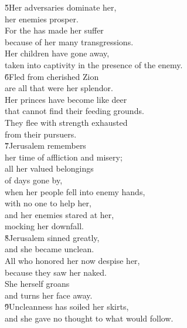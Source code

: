 \begin{poetry}
\poeml \v{5}Her adversaries dominate her, \\
\poemll    her enemies prosper. \\
\poeml For the  has made her suffer \\
\poemll    because of her many transgressions. \\
\poeml Her children have gone away, \\
\poemll    taken into captivity in the presence of the enemy. \\
\poeml \v{6}Fled from cherished Zion \\
\poemll    are all that were her splendor. \\
\poeml Her princes have become like deer \\
\poemll    that cannot find their feeding grounds. \\
\poeml They flee with strength exhausted \\
\poemll    from their pursuers. \\
\poeml \v{7}Jerusalem remembers \\
\poemll    her time of affliction and misery; \\
\poeml all her valued belongings \\
\poemll    of days gone by, \\
\poeml when her people fell into enemy hands, \\
\poemll    with no one to help her, \\
\poeml and her enemies stared at her, \\
\poemll    mocking her downfall. \\
\poeml \v{8}Jerusalem sinned greatly, \\
\poemll    and she became unclean. \\
\poeml All who honored her now despise her, \\
\poemll    because they saw her naked. \\
\poeml She herself groans \\
\poemll    and turns her face away. \\
\poeml \v{9}Uncleanness has soiled her skirts, \\
\poemll    and she gave no thought to what would follow. \\

\end{poetry}
